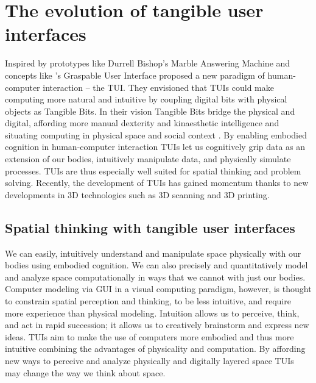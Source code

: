 \documentclass{article}
\begin{document}

\clearpage


\section{The evolution of tangible user interfaces}
Inspired by prototypes like Durrell Bishop's Marble Answering Machine \citep{Poynor1995}
and concepts like \citeauthor{Fitzmaurice1995}'s Graspable User Interface \citeyearpar{Fitzmaurice1995} \citet{Ishii1997} proposed a new paradigm of human-computer interaction -- the TUI.
They envisioned that TUIs could make computing more natural and intuitive by coupling digital bits with physical objects as Tangible Bits. In their vision Tangible Bits bridge the physical and digital, affording more manual dexterity and kinaesthetic intelligence and situating computing in physical space and social context \citep{Ishii1997, Dourish2001}.
By enabling embodied cognition in human-computer interaction TUIs let us cognitively grip data as an extension of our bodies, intuitively manipulate data, and physically simulate processes. 
TUIs are thus especially well suited for spatial thinking and problem solving. 
Recently, the development of TUIs has gained momentum thanks to new developments in 3D technologies such as
3D scanning and 3D printing.


\subsection{Spatial thinking with tangible user interfaces}

We can easily, intuitively understand and manipulate space physically with our bodies using embodied cognition. 
We can also precisely and quantitatively model and analyze space computationally
in ways that we cannot with just our bodies.
Computer modeling via GUI in a visual computing paradigm, however, is thought to 
constrain spatial perception and thinking, to be less intuitive, and require more experience 
than physical modeling.
Intuition allows us to perceive, think, and act in rapid succession; it allows us to creatively brainstorm and express new ideas.
TUIs aim to make the use of computers more embodied and thus more intuitive combining the advantages of physicality and computation. 
By affording new ways to perceive and analyze physically and digitally layered space
TUIs may change the way we think about space.
\end{document}
